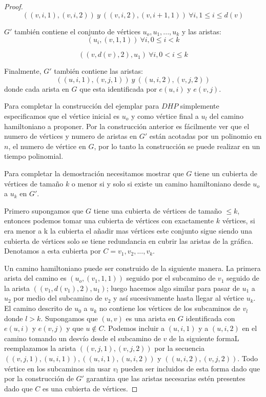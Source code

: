 \documentclass{article}
\begin{document}
\begin{proof}
  \begin{equation*}
    ((v,i,1),(v,i,2))\ y\ ((v,i,2),(v,i+1,1))\ \forall i, 1 \leqslant i \leqslant d(v)
  \end{equation*}

  $G'$ también contiene el conjunto de vértices ${ u_o, u_1, ..., u_k }$ y las aristas:
  \begin{equation*}
    (u_i, (v,1,1))\ \forall i, 0 \leqslant i < k
  \end{equation*}

  \begin{equation*}
    ((v,d(v),2),u_1)\ \forall i, 0 < i \leqslant k
  \end{equation*}

  Finalmente, $G'$ también contiene las aristas:
  \begin{equation*}
    ((u,i,1),(v,j,1))\ y\ ((u,i,2),(v,j,2))
  \end{equation*}
  donde cada arista en $G$ que esta identificada por $e(u,i)$ y $e(v,j)$.

  Para completar la construcción del ejemplar para $DHP$ simplemente especificamos que el vértice inicial es $u_o$ y como vértice final a $u_l$ del camino hamiltoniano a proponer. Por la construcción anterior es fácilmente  ver que el numero de vértices y numero de aristas en $G'$ están acotadas por un polinomio en $n$, el numero de vértice en $G$, por lo tanto la construcción se puede realizar en un tiempo polinomial.

  Para completar la demostración necesitamos mostrar que $G$ tiene un cubierta de vértices de tamaño $k$ o menor si y solo si existe un camino hamiltoniano desde $u_o$ a $u_k$ en $G'$.

  Primero supongamos que $G$ tiene una cubierta de vértices de tamaño $\leqslant k$, entonces podemos tomar una cubierta de vértices con exactamente $k$ vértices, si era menor a k la cubierta el añadir mas vértices este conjunto sigue siendo una cubierta de vértices solo se tiene redundancia en cubrir las aristas de la gráfica. Denotamos a esta cubierta por $C = {v_1, v_2, ..., v_k}$.

  Un camino hamiltoniano puede ser construido de la siguiente manera. La primera arista del camino es $(u_o, (v_1,1,1))$ seguido por el subcamino de $v_1$ seguido de la arista $((v_1, d(v_1),2), u_1)$; luego hacemos algo similar para pasar de $u_1$ a $u_2$ por medio del subcamino de $v_2$ y así sucesivamente hasta llegar al vértice $u_k$. El camino descrito de $u_0$ a $u_k$ no contiene los vértices de los subcaminos de $v_l$ donde $l > k$. Supongamos que $(u,v)$ es una arista en $G$ identificada con $e(u,i)$ y $e(v,j)$ y que $u \notin C$. Podemos incluir a $(u,i,1)$ y a $(u,i,2)$ en el camino tomando un desvío desde el subcamino de $v$ de la siguiente formaL reemplazamos la arista  $((v,j,1),(v,j,2))$ por la secuencia $((v,j,1),(u,i,1)),((u,i,1),(u,i,2))$ y $((u,i,2),(v,j,2))$. Todo vértice en los subcaminos sin usar $v_l$ pueden ser incluidos de esta forma dado que por la construcción de $G'$ garantiza que las aristas necesarias estén presentes dado que $C$ es una cubierta de vértices.


\end{proof}
\end{document}
